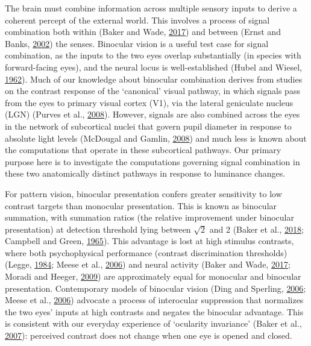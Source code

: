 \documentclass[
]{article}
\begin{document}
The brain must combine information across multiple sensory inputs to derive a coherent percept of the external world. This involves a process of signal combination both within (Baker and Wade, \protect\hyperlink{ref-Baker2017}{2017}) and between (Ernst and Banks, \protect\hyperlink{ref-Ernst2002}{2002}) the senses. Binocular vision is a useful test case for signal combination, as the inputs to the two eyes overlap substantially (in species with forward-facing eyes), and the neural locus is well-established (Hubel and Wiesel, \protect\hyperlink{ref-Hubel1962}{1962}). Much of our knowledge about binocular combination derives from studies on the contrast response of the `canonical' visual pathway, in which signals pass from the eyes to primary visual cortex (V1), via the lateral geniculate nucleus (LGN) (Purves et al., \protect\hyperlink{ref-Purves2008}{2008}). However, signals are also combined across the eyes in the network of subcortical nuclei that govern pupil diameter in response to absolute light levels (McDougal and Gamlin, \protect\hyperlink{ref-McDougal2008}{2008}) and much less is known about the computations that operate in these subcortical pathways. Our primary purpose here is to investigate the computations governing signal combination in these two anatomically distinct pathways in response to luminance changes.

For pattern vision, binocular presentation confers greater sensitivity to low contrast targets than monocular presentation. This is known as binocular summation, with summation ratios (the relative improvement under binocular presentation) at detection threshold lying between \(\sqrt{2}\) and 2 (Baker et al., \protect\hyperlink{ref-Baker2018}{2018}; Campbell and Green, \protect\hyperlink{ref-Campbell1965}{1965}). This advantage is lost at high stimulus contrasts, where both psychophysical performance (contrast discrimination thresholds) (Legge, \protect\hyperlink{ref-Legge1984}{1984}; Meese et al., \protect\hyperlink{ref-Meese2006}{2006}) and neural activity (Baker and Wade, \protect\hyperlink{ref-Baker2017}{2017}; Moradi and Heeger, \protect\hyperlink{ref-Moradi2009}{2009}) are approximately equal for monocular and binocular presentation. Contemporary models of binocular vision (Ding and Sperling, \protect\hyperlink{ref-Ding2006}{2006}; Meese et al., \protect\hyperlink{ref-Meese2006}{2006}) advocate a process of interocular suppression that normalizes the two eyes' inputs at high contrasts and negates the binocular advantage. This is consistent with our everyday experience of `ocularity invariance' (Baker et al., \protect\hyperlink{ref-Baker2007}{2007}): perceived contrast does not change when one eye is opened and closed.
\end{document}
